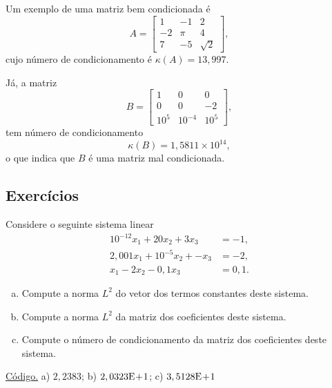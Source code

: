 \begin{ex}\label{ex:kappa}
  Um exemplo de uma matriz bem condicionada é
  \begin{equation}
    A =
    \begin{bmatrix}
      1 & -1 & 2\\
      -2 & \pi & 4\\
      7 & -5 & \sqrt{2}
    \end{bmatrix},
  \end{equation}
  cujo número de condicionamento é $\kappa(A) = 13,997$.

  Já, a matriz
  \begin{equation}
    B =
    \begin{bmatrix}
      1 & 0 & 0\\
      0 & 0 & -2\\
      10^{5} & 10^{-4} & 10^{5}
    \end{bmatrix},    
  \end{equation}
  tem número de condicionamento
  \begin{equation}
    \kappa(B) = 1,5811\times 10^{14},
  \end{equation}
  o que indica que $B$ é uma matriz mal condicionada.
\end{ex}

\subsection*{Exercícios}

\begin{exer}\label{exer:norma_numcond}
  Considere o seguinte sistema linear
  \begin{align}
    10^{-12}x_1 + 20x_2 + 3x_3 &= -1,\\
    2,001x_1 + 10^{-5}x_2 + - x_3 &= -2,\\
    x_1 - 2x_2 - 0,1x_3 &= 0,1.
  \end{align}
  \begin{enumerate}[a)]
  \item Compute a norma $L^2$ do vetor dos termos constantes deste sistema.
  \item Compute a norma $L^2$ da matriz dos coeficientes deste sistema.
  \item Compute o número de condicionamento da matriz dos coeficientes deste sistema.
  \end{enumerate}
\end{exer}
\begin{resp}
  \ifisoctave 
  \href{https://github.com/phkonzen/notas/blob/master/src/MatematicaNumerica/cap_sl_direto/dados/exer_norma_numcond/exer_norma_numcond.m}{Código.} 
  \fi
  a) $2,2383$; b) $2,0323\mathrm{E}\!+\!1$; c) $3,5128\mathrm{E}\!+\!1$
\end{resp}


